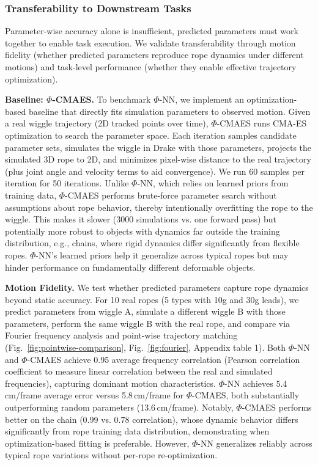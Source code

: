 \documentclass[conference]{IEEEtran}
\begin{document}
\subsubsection{Transferability to Downstream Tasks}

Parameter-wise accuracy alone is insufficient, predicted parameters must work together to enable task execution. We validate transferability through motion fidelity (whether predicted parameters reproduce rope dynamics under different motions) and task-level performance (whether they enable effective trajectory optimization).

\textbf{Baseline: $\Phi$-CMAES.} To benchmark $\Phi$-NN, we implement an optimization-based baseline that directly fits simulation parameters to observed motion. Given a real wiggle trajectory (2D tracked points over time), $\Phi$-CMAES runs CMA-ES optimization to search the parameter space. Each iteration samples candidate parameter sets, simulates the wiggle in Drake with those parameters, projects the simulated 3D rope to 2D, and minimizes pixel-wise distance to the real trajectory (plus joint angle and velocity terms to aid convergence). We run 60 samples per iteration for 50 iterations. Unlike $\Phi$-NN, which relies on learned priors from training data, $\Phi$-CMAES performs brute-force parameter search without assumptions about rope behavior, thereby intentionally overfitting the rope to the wiggle. This makes it slower (3000 simulations vs. one forward pass) but potentially more robust to objects with dynamics far outside the training distribution, e.g., chains, where rigid dynamics differ significantly from flexible ropes. $\Phi$-NN's learned priors help it generalize across typical ropes but may hinder performance on fundamentally different deformable objects.

\textbf{Motion Fidelity.} We test whether predicted parameters capture rope dynamics beyond static accuracy. For 10 real ropes (5 types with 10g and 30g leads), we predict parameters from wiggle A, simulate a different wiggle B with those parameters, perform the same wiggle B with the real rope, and compare via Fourier frequency analysis and point-wise trajectory matching (Fig.~\ref{fig:pointwise-comparison}, Fig.~\ref{fig:fourier}, Appendix table 1). Both $\Phi$-NN and $\Phi$-CMAES achieve 0.95 average frequency correlation (Pearson correlation coefficient to measure linear correlation between the real and simulated frequencies), capturing dominant motion characteristics. 
$\Phi$-NN achieves 5.4\,cm/frame average error versus 5.8\,cm/frame for $\Phi$-CMAES, both substantially outperforming random parameters (13.6\,cm/frame).
Notably, $\Phi$-CMAES performs better on the chain (0.99 vs. 0.78 correlation), whose dynamic behavior differs significantly from rope training data distribution, demonstrating when optimization-based fitting is preferable. However, $\Phi$-NN generalizes reliably across typical rope variations without per-rope re-optimization.
\end{document}
